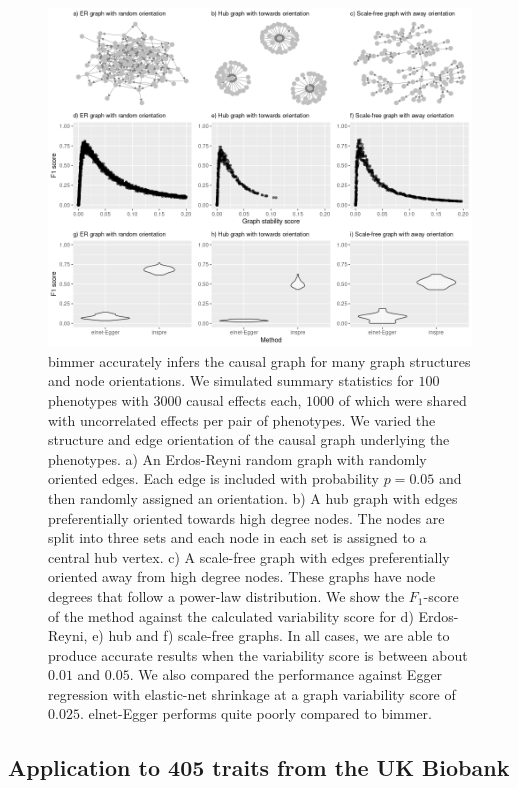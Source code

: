 \documentclass{article}
\begin{document}
\begin{figure}\label{figure4}
\includegraphics[width=\textwidth]{figures/figure4.png}
\caption{bimmer accurately infers the causal graph for many graph structures and node
orientations. We simulated summary statistics for $100$ phenotypes with $3000$ causal
effects each, $1000$ of which were shared with uncorrelated effects per pair of phenotypes.
We varied the structure and edge orientation of the causal graph underlying the phenotypes.
a) An Erdos-Reyni random graph with randomly oriented edges. Each edge is
included with probability $p=0.05$ and then randomly assigned an orientation. b) A hub
graph with edges preferentially oriented towards high degree nodes. The nodes are split into
three sets and each node in each set is assigned to a central hub vertex. c) A scale-free
graph with edges preferentially oriented away from high degree nodes. These graphs have
node degrees that follow a power-law distribution. We show the $F_1$-score of the method
against the calculated variability score for d) Erdos-Reyni, e) hub and f) scale-free graphs.
In all cases, we are able to produce accurate results when the variability score is between
about $0.01$ and $0.05$. We also compared the performance against Egger regression
with elastic-net shrinkage at a graph variability score of $0.025$. elnet-Egger
performs quite poorly compared to bimmer.}
\end{figure}


\subsection*{Application to 405 traits from the UK Biobank}
\end{document}

